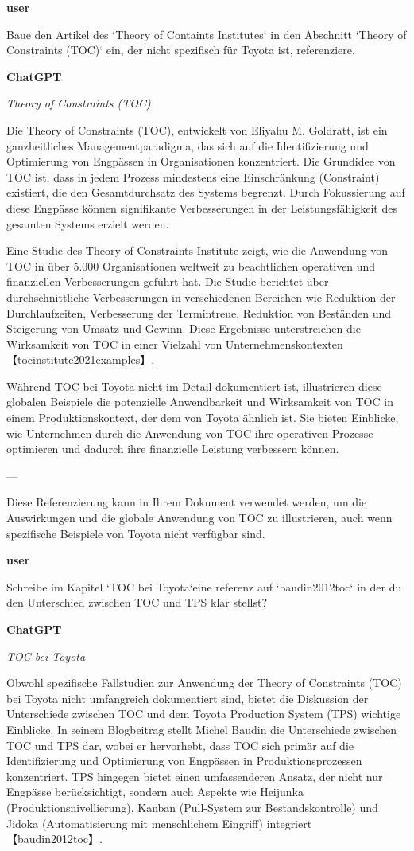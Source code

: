 \textbf{user}

Baue den Artikel des `Theory of Containts Institutes` in den Abschnitt `Theory of Constraints (TOC)` ein, der nicht spezifisch für Toyota ist, referenziere.

\textbf{ChatGPT}

\textit{Theory of Constraints (TOC)}

Die Theory of Constraints (TOC), entwickelt von Eliyahu M. Goldratt, ist ein ganzheitliches Managementparadigma, das sich auf die Identifizierung und Optimierung von Engpässen in Organisationen konzentriert. Die Grundidee von TOC ist, dass in jedem Prozess mindestens eine Einschränkung (Constraint) existiert, die den Gesamtdurchsatz des Systems begrenzt. Durch Fokussierung auf diese Engpässe können signifikante Verbesserungen in der Leistungsfähigkeit des gesamten Systems erzielt werden.

Eine Studie des Theory of Constraints Institute zeigt, wie die Anwendung von TOC in über 5.000 Organisationen weltweit zu beachtlichen operativen und finanziellen Verbesserungen geführt hat. Die Studie berichtet über durchschnittliche Verbesserungen in verschiedenen Bereichen wie Reduktion der Durchlaufzeiten, Verbesserung der Termintreue, Reduktion von Beständen und Steigerung von Umsatz und Gewinn. Diese Ergebnisse unterstreichen die Wirksamkeit von TOC in einer Vielzahl von Unternehmenskontexten【tocinstitute2021examples】.

Während TOC bei Toyota nicht im Detail dokumentiert ist, illustrieren diese globalen Beispiele die potenzielle Anwendbarkeit und Wirksamkeit von TOC in einem Produktionskontext, der dem von Toyota ähnlich ist. Sie bieten Einblicke, wie Unternehmen durch die Anwendung von TOC ihre operativen Prozesse optimieren und dadurch ihre finanzielle Leistung verbessern können.

---

Diese Referenzierung kann in Ihrem Dokument verwendet werden, um die Auswirkungen und die globale Anwendung von TOC zu illustrieren, auch wenn spezifische Beispiele von Toyota nicht verfügbar sind.

\textbf{user}

Schreibe im Kapitel `TOC bei Toyota`eine referenz auf `baudin2012toc` in der du den Unterschied zwischen TOC und TPS klar stellst?

\textbf{ChatGPT}

\textit{TOC bei Toyota}

Obwohl spezifische Fallstudien zur Anwendung der Theory of Constraints (TOC) bei Toyota nicht umfangreich dokumentiert sind, bietet die Diskussion der Unterschiede zwischen TOC und dem Toyota Production System (TPS) wichtige Einblicke. In seinem Blogbeitrag stellt Michel Baudin die Unterschiede zwischen TOC und TPS dar, wobei er hervorhebt, dass TOC sich primär auf die Identifizierung und Optimierung von Engpässen in Produktionsprozessen konzentriert. TPS hingegen bietet einen umfassenderen Ansatz, der nicht nur Engpässe berücksichtigt, sondern auch Aspekte wie Heijunka (Produktionsnivellierung), Kanban (Pull-System zur Bestandskontrolle) und Jidoka (Automatisierung mit menschlichem Eingriff) integriert【baudin2012toc】.

